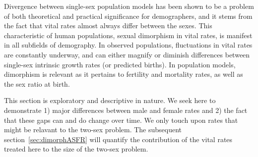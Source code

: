  \FloatBarrier
Divergence between single-sex population models has been shown to be a problem
of both theoretical and practical significance for demographers, and it stems from
the fact that vital rates almost always differ between the sexes.
This characteristic of human populations, sexual dimorphism in vital rates,
is manifest in all subfields of demography. In observed populations,
fluctuations in vital rates are constantly underway, and can either magnify or
diminish differences between single-sex intrinsic growth rates (or predicted
births). In population models, dimorphism is relevant as
it pertains to fertility and mortality rates, as well as the sex ratio at birth.

This section is exploratory and descriptive in nature. We seek here to
demonstrate 1) major differences between male and female rates and 2) the fact
that these gaps can and do change over time. We only touch upon rates that might
be relavant to the two-sex problem. The subsequent section~\ref{sec:dimorphASFR}
will quantify the contribution of the vital rates treated here to the size of the two-sex
problem.
